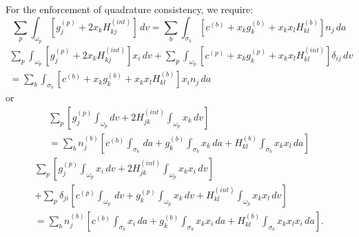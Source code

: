\documentclass[11pt]{article} %
\begin{document}
For the enforcement of quadrature consistency, we require:
\begin{equation}
	\sum_p \int_{\omega_p} \left[ g^{(p)}_j + 2 x_k H^{(int)}_{kj} \right] \, dv = \sum_b \int_{\sigma_b} \left[ c^{(b)} + x_k g^{(b)}_k + x_k x_l H^{(b)}_{kl} \right] n_j \, da
\end{equation}
\begin{eqnarray}
	\sum_p \int_{\omega_p} \left[ g^{(p)}_j + 2 x_k H^{(int)}_{kj} \right] x_i \, dv + \sum_p \int_{\omega_p} \left[ c^{(p)} + x_k g^{(p)}_k + x_k x_l H^{(int)}_{kl} \right] \delta_{ij} \, dv \nonumber \\ = \sum_b \int_{\sigma_b} \left[ c^{(b)} + x_k g^{(b)}_k + x_k x_l H^{(b)}_{kl} \right] x_i n_j \, da
\end{eqnarray}
or
\begin{eqnarray}
	\sum_p \left[ g^{(p)}_j \int_{\omega_p} dv + 2 H^{(int)}_{jk} \int_{\omega_p} x_k \, dv \right] \nonumber \\ = \sum_b n^{(b)}_j \left[ c^{(b)} \int_{\sigma_b} \, da + g^{(b)}_k \int_{\sigma_b} x_k \, da + H^{(b)}_{kl} \int_{\sigma_b} x_k x_l \, da \right]
\end{eqnarray}
\begin{eqnarray}
	\sum_p \left[ g^{(p)}_j \int_{\omega_p} x_i \, dv + 2 H^{(int)}_{jk} \int_{\omega_p} x_k x_i \, dv \right] \nonumber \\ + \sum_p \delta_{ji} \left[ c^{(p)} \int_{\omega_p} \, dv + g^{(p)}_k \int_{\omega_p} x_k \, dv + H^{(int)}_{kl} \int_{\omega_p} x_k x_l \, dv \right] \nonumber \\ = \sum_b n^{(b)}_j \left[ c^{(b)} \int_{\sigma_b} x_i \, da + g^{(b)}_k \int_{\sigma_b} x_k x_i \, da + H^{(b)}_{kl} \int_{\sigma_b} x_k x_l x_i \, da \right] .
\end{eqnarray}
\end{document}
